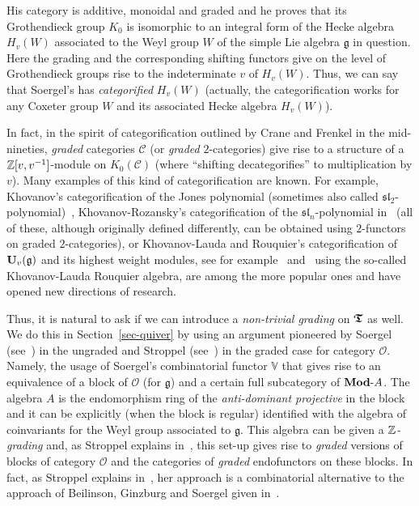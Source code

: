 His category is additive, monoidal and graded 
and he proves that its Grothendieck group $K_0$ 
is isomorphic to an integral form of the Hecke algebra 
$H_v(W)$ associated to the Weyl group $W$ of the simple 
Lie algebra $\mathfrak{g}$ in question. Here the grading 
and the corresponding shifting functors give on the level 
of Grothendieck groups rise to the indeterminate $v$ of $H_v(W)$.
Thus, we can say that Soergel's has 
\textit{categorified} $H_v(W)$ (actually, the 
categorification works for any Coxeter group $W$ 
and its associated Hecke algebra $H_v(W)$).



In fact, in the spirit of categorification 
outlined by Crane and Frenkel in the mid-nineties, 
\textit{graded} categories $\mathcal C$ 
(or \textit{graded} $2$-categories) give rise to a structure 
of a $\mathbb{Z}[v,v^{-1}]$-module on $K_0(\mathcal C)$ 
(where ``shifting decategorifies'' to multiplication by $v$). 
Many examples of this kind of categorification are 
known. For example, Khovanov's categorification 
of the Jones polynomial (sometimes also called 
$\mathfrak{sl}_2$-polynomial)~\cite{kh1}, Khovanov-Rozansky's categorification 
of the $\mathfrak{sl}_n$-polynomial in~\cite{kr1} (all of these, 
although originally defined differently, 
can be obtained using $2$-functors on graded $2$-categories), 
or Khovanov-Lauda and Rouquier's categorification of 
$\boldsymbol{\mathrm{U}}_v(\mathfrak{g})$ and its highest weight modules, 
see for example~\cite{kl5} and~\cite{rou} using the so-called 
Khovanov-Lauda Rouquier algebra, are among 
the more popular ones and have opened new directions of research.



Thus, it is natural to ask if we can introduce 
a \textit{non-trivial grading} on $\boldsymbol{\mathfrak{T}}$ as well. 
We do this in Section~\ref{sec-quiver} by using 
an argument pioneered by Soergel (see~\cite{soe1}) 
in the ungraded and Stroppel (see~\cite{st2}) in 
the graded case for category $\mathcal O$. Namely, 
the usage of Soergel's combinatorial functor $\mathbb{V}$ 
that gives rise to an equivalence of a block of 
$\mathcal O$ (for $\mathfrak{g}$) and a certain 
full subcategory of $\boldsymbol{\mathrm{Mod}}\text{-}A$. The algebra $A$ is 
the endomorphism ring of the \textit{anti-dominant projective} 
in the block and it can be explicitly (when the block is regular) 
identified with the algebra of coinvariants for the Weyl group 
associated to $\mathfrak{g}$. This algebra can be given a 
\textit{$\mathbb{Z}$-grading} and, as Stroppel explains in~\cite{st2}, 
this set-up gives rise to \textit{graded} versions of 
blocks of category $\mathcal O$ and the categories of 
\textit{graded} endofunctors on these blocks.
In fact, as Stroppel explains in~\cite{st2}, her 
approach is a combinatorial alternative to the 
approach of Beilinson, Ginzburg and Soergel given in~\cite{bgs}.



